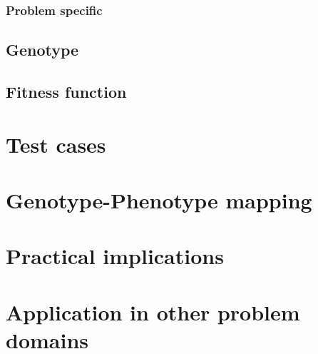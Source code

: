 \documentclass[12pt]{article}
\begin{document}
		\subsubsection{Problem specific}
		
	\subsection{Genotype}
	\subsection{Fitness function}
\section{Test cases}
\section{Genotype-Phenotype mapping}
\section{Practical implications}
\section{Application in other problem domains}
\end{document}
